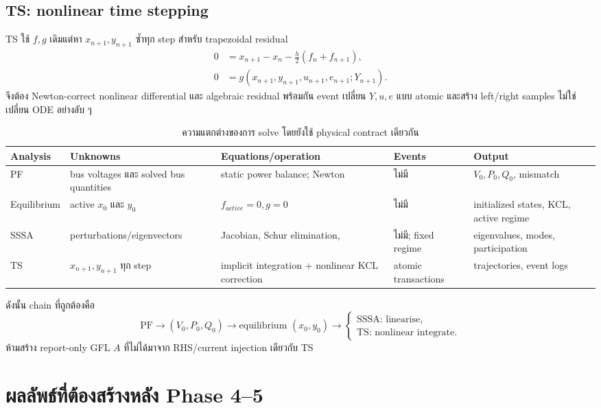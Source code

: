 \documentclass[12pt,a4paper]{article}
\newcommand{\code}[1]{\texttt{\detokenize{#1}}}
\begin{document}
\subsection{TS: nonlinear time stepping}

TS ใช้ $f,g$ เดิมแต่หา $x_{n+1},y_{n+1}$ ซ้ำทุก step สำหรับ trapezoidal residual
\begin{align}
0&=x_{n+1}-x_n-\frac{h}{2}(f_n+f_{n+1}),\\
0&=g(x_{n+1},y_{n+1},u_{n+1},e_{n+1};Y_{n+1}).
\end{align}
จึงต้อง Newton-correct nonlinear differential และ algebraic residual พร้อมกัน
event เปลี่ยน $Y,u,e$ แบบ atomic และสร้าง left/right samples ไม่ใช่เปลี่ยน ODE
อย่างลับ ๆ

\begin{table}[H]\centering\small
\caption{ความแตกต่างของการ solve โดยยังใช้ physical contract เดียวกัน}
\begin{tabularx}{\textwidth}{p{}p{}p{}p{}X}
\toprule
Analysis & Unknowns & Equations/operation & Events & Output \\ \midrule
PF & bus voltages และ solved bus quantities & static power balance; Newton & ไม่มี & $V_0,P_0,Q_0$, mismatch \\
Equilibrium & active $x_0$ และ $y_0$ & $f_{active}=0,g=0$ & ไม่มี & initialized states, KCL, active regime \\
SSSA & perturbations/eigenvectors & Jacobian, Schur elimination, \code{eig} & ไม่มี; fixed regime & eigenvalues, modes, participation \\
TS & $x_{n+1},y_{n+1}$ ทุก step & implicit integration + nonlinear KCL correction & atomic transactions & trajectories, event logs \\
\bottomrule
\end{tabularx}
\end{table}

ดังนั้น chain ที่ถูกต้องคือ
\begin{equation}
\text{PF}\longrightarrow(V_0,P_0,Q_0)
\longrightarrow\text{equilibrium }(x_0,y_0)
\longrightarrow\begin{cases}\text{SSSA: linearise},\\\text{TS: nonlinear integrate}.\end{cases}
\end{equation}
ห้ามสร้าง report-only GFL $A$ ที่ไม่ได้มาจาก RHS/current injection เดียวกับ TS

\section{ผลลัพธ์ที่ต้องสร้างหลัง Phase 4--5}
\end{document}
